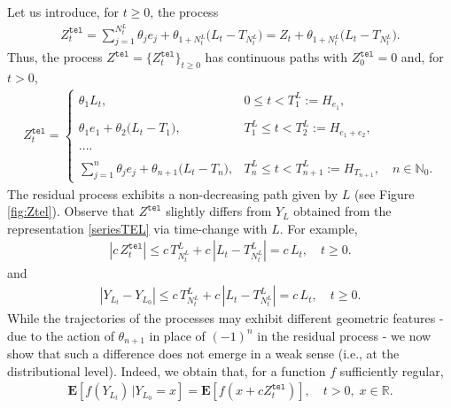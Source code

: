 \documentclass[10pt,a4paper]{article}
\numberwithin{equation}{section}
\theoremstyle{plain}
\theoremstyle{remark}
\begin{document}
Let us introduce, for $t\geq 0$, the process
\begin{align*}
Z_t^\mathtt{tel} =  \sum_{j=1}^{N^L_t} \theta_j e_j + \theta_{1 + N^L_t}\big( L_t - T_{N^L_t}\big) = Z_t + \theta_{1 + N^L_t} \big( L_t - T_{N^L_t}\big).
\end{align*}
Thus, the process $Z^\mathtt{tel} = \{Z^\mathtt{tel}_t\}_{t\geq 0}$ has continuous paths with $Z^\mathtt{tel}_0=0$ and, for $t>0$,   
\begin{align*}
Z^\mathtt{tel}_t = \left\lbrace
\begin{array}{ll}
\displaystyle \theta_1 L_t, & 0 \leq t < T^L_1 := H_{e_1},\\
\\
\displaystyle \theta_1 e_1 + \theta_2 \big(L_t - T_1 \big), & T^L_1 \leq t < T^L_2 := H_{e_1 + e_2}, \\
\\
\displaystyle  .... \\
\\
\displaystyle \sum_{j=1}^n \theta_j e_j + \theta_{n+1} \big(L_t - T_n \big), & T^L_n \leq t < T^L_{n+1} := H_{T_{n+1}}, \quad n \in \mathbb{N}_0 .
\end{array}
\right . 
\end{align*}
The residual process exhibits a non-decreasing path given by $L$ (see Figure \ref{fig:Ztel}). Observe that $Z^\mathtt{tel}$ slightly differs from $Y_{L}$ obtained from the representation \eqref{seriesTEL} via time-change with $L$. For example, 
\begin{align*}
|c \, Z^\mathtt{tel}_t| \leq c\,T^L_{N^L_t} +  c\,| L_t - T^L_{N^L_t} | = c \,L_t, \quad t\geq 0.
\end{align*}
and
\begin{align*}
|Y_{L_t} - Y_{L_0}| \leq c\,T^L_{N^L_t} +  c\,| L_t - T^L_{N^L_t} | = c \, L_t, \quad t\geq 0.
\end{align*}
While the trajectories of the processes may exhibit different geometric features - due to the action of $\theta_{n+1}$ in place of $(-1)^{n}$ in the residual process - we now show that such a difference does not emerge in a weak sense (i.e., at the distributional level). Indeed, we obtain that, for a function $f$ sufficiently regular,
\begin{align*}
\mathbf{E}[f(Y_{L_t}) \, | Y_{L_0}=x] = \mathbf{E}[ f(x + c Z^\mathtt{tel}_t)], \quad t >0,\; x \in \mathbb{R}.
\end{align*}
\end{document}

